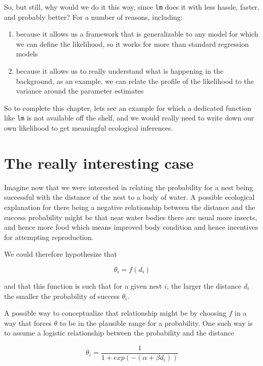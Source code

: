 \documentclass[
]{book}
\providecommand{\tightlist}{%
  \setlength{\itemsep}{0pt}\setlength{\parskip}{0pt}}
\begin{document}
So, but still, why would we do it this way, since \texttt{lm} does it with less hassle, faster, and probably better? For a number of reasons, including:

\begin{enumerate}
\def\labelenumi{\arabic{enumi}.}
\tightlist
\item
  because it allows us a framework that is generalizable to any model for which we can define the likelihood, so it works for more than standard regression models
\item
  because it allows us to really understand what is happening in the background, as an example, we can relate the profile of the likelihood to the variance around the parameter estimates
\end{enumerate}

So to complete this chapter, lets see an example for which a dedicated function like \texttt{lm} is not available off the shelf, and we would really need to write down our own likelihood to get meaningful ecological inferences.

\hypertarget{the-really-interesting-case}{%
\section{The really interesting case}\label{the-really-interesting-case}}

Imagine now that we were interested in relating the probability for a nest being successful with the distance of the nest to a body of water. A possible ecological explanation for there being a negative relationship between the distance and the success probability might be that near water bodies there are usual more insects, and hence more food which means improved body condition and hence incentives for attempting reproduction.

We could therefore hypothesize that

\[\theta_i=f(d_i)\]

and that this function is such that for a given nest \(i\), the larger the distance \(d_i\) the smaller the probability of success \(\theta_i\).

A possible way to conceptualize that relationship might be by choosing \(f\) in a way that forces \(\theta\) to be in the plausible range for a probability. One such way is to assume a logistic relationship between the probability and the distance

\[\theta_i=\frac{1}{1+exp(-(\alpha+\beta d_i))}\]
\end{document}
